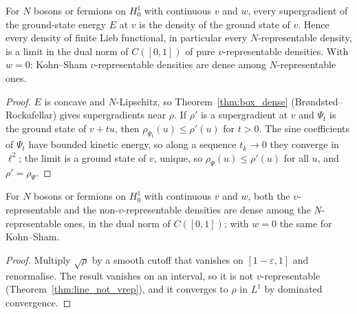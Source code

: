 \begin{theorem}
  \label{thm:line_dense}
  \leanok
  For $N$ bosons or fermions on $H^1_0$ with continuous $v$ and $w$, every supergradient of the ground-state energy
  $E$ at $v$ is the density of the ground state of $v$. Hence every density of finite Lieb functional, in particular
  every $N$-representable density, is a limit in the dual norm of $C([0,1])$ of pure $v$-representable densities.
  With $w=0$: Kohn--Sham $v$-representable densities are dense among $N$-representable ones.
\end{theorem}
\begin{proof}
  \leanok
  $E$ is concave and $N$-Lipschitz, so Theorem~\ref{thm:box_dense} (Brøndsted--Rockafellar) gives supergradients near
  $\rho$. If $\rho'$ is a supergradient at $v$ and $\Psi_t$ is the ground state of $v+tu$, then
  $\rho_{\Psi_t}(u)\le\rho'(u)$ for $t>0$. The sine coefficients of $\Psi_t$ have bounded kinetic energy, so along a
  sequence $t_k\to0$ they converge in $\ell^2$; the limit is a ground state of $v$, unique, so $\rho_\Psi(u)\le\rho'(u)$
  for all $u$, and $\rho'=\rho_\Psi$.
\end{proof}

\begin{theorem}
  \label{thm:line_nonvrep_dense}
  \leanok
  For $N$ bosons or fermions on $H^1_0$ with continuous $v$ and $w$, both the $v$-representable and the
  non-$v$-representable densities are dense among the $N$-representable ones, in the dual norm of $C([0,1])$; with
  $w=0$ the same for Kohn--Sham.
\end{theorem}
\begin{proof}
  \leanok
  Multiply $\sqrt\rho$ by a smooth cutoff that vanishes on $[1-\varepsilon,1]$ and renormalise. The result vanishes on an
  interval, so it is not $v$-representable (Theorem~\ref{thm:line_not_vrep}), and it converges to $\rho$ in $L^1$ by
  dominated convergence.
\end{proof}

